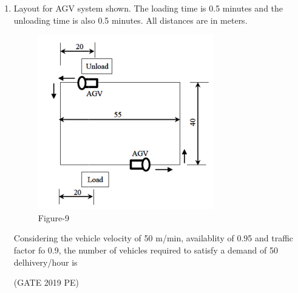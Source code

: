 \documentclass[journal,12pt,onecolumn]{exam}
\theoremstyle{remark}
\begin{document}
\begin{enumerate}
\item Layout for AGV system shown. The loading time is 0.5 minutes and the unloading time is also 0.5 minutes. All distances are in meters.
\begin{figure}[H]
    \centering
    \includegraphics[width=0.5\linewidth]{figs/fig9.png}
    \caption{Figure-9}
    \label{fig:figs/fig9.png}
\end{figure}

Considering the vehicle velocity of 50 m/min, availablity of 0.95 and traffic factor fo 0.9, the number of vehicles required to satisfy a demand of 50 delhivery/hour is

\hfill{(GATE 2019 PE)}\\
\end{enumerate}
\end{document}
